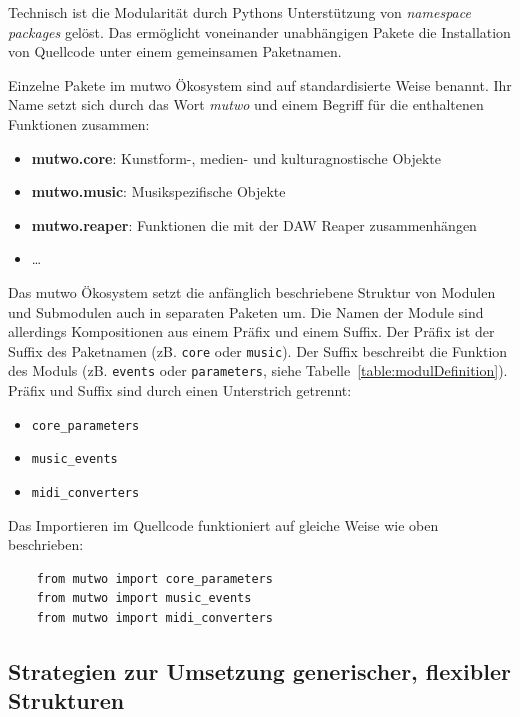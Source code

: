 \documentclass[12pt,a4paper,ngerman]{article}
\begin{document}
Technisch ist die Modularität durch Pythons Unterstützung von \emph{namespace packages} gelöst.
Das ermöglicht voneinander unabhängigen Pakete die Installation von Quellcode unter einem gemeinsamen Paketnamen.

Einzelne Pakete im mutwo Ökosystem sind auf standardisierte Weise benannt.
Ihr Name setzt sich durch das Wort \emph{mutwo} und einem Begriff für die enthaltenen Funktionen zusammen:

\begin{itemize}
    \item{\textbf{mutwo.core}: Kunstform-, medien- und kulturagnostische Objekte}
    \item{\textbf{mutwo.music}: Musikspezifische Objekte}
    \item{\textbf{mutwo.reaper}: Funktionen die mit der DAW Reaper zusammenhängen}
    \item{\dots}
\end{itemize}

Das mutwo Ökosystem setzt die anfänglich beschriebene Struktur von Modulen und Submodulen auch in separaten Paketen um.
Die Namen der Module sind allerdings Kompositionen aus einem Präfix und einem Suffix.
Der Präfix ist der Suffix des Paketnamen (zB. \texttt{core} oder \texttt{music}).
Der Suffix beschreibt die Funktion des Moduls (zB. \texttt{events} oder \texttt{parameters}, siehe Tabelle~\ref{table:modulDefinition}).
Präfix und Suffix sind durch einen Unterstrich getrennt:

\begin{itemize}
    \item{\texttt{core\_parameters}}
    \item{\texttt{music\_events}}
    \item{\texttt{midi\_converters}}
\end{itemize}

Das Importieren im Quellcode funktioniert auf gleiche Weise wie oben beschrieben:


\begin{lstlisting}
    from mutwo import core_parameters
    from mutwo import music_events
    from mutwo import midi_converters
\end{lstlisting}


\subsection{Strategien zur Umsetzung generischer, flexibler Strukturen}
\end{document}
